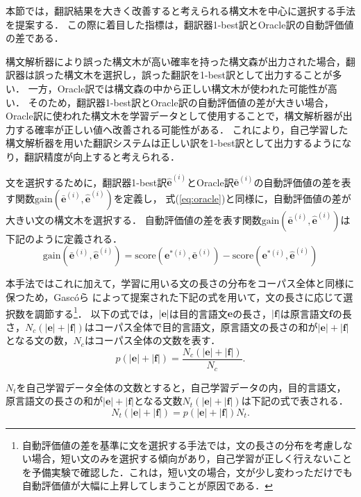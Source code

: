 \documentclass[japanese]{jnlp_1.4}
\begin{document}
本節では，翻訳結果を大きく改善すると考えられる構文木を中心に選択する手法を提案する．
この際に着目した指標は，翻訳器1-best訳とOracle訳の自動評価値の差である．

構文解析器により誤った構文木が高い確率を持った構文森が出力された場合，翻訳器は誤った構文木を選択し，誤った翻訳を1-best訳として出力することが多い．
一方，Oracle訳では構文森の中から正しい構文木が使われた可能性が高い．
そのため，翻訳器1-best訳とOracle訳の自動評価値の差が大きい場合，Oracle訳に使われた構文木を学習データとして使用することで，構文解析器が出力する確率が正しい値へ改善される可能性がある．
これにより，自己学習した構文解析器を用いた翻訳システムは正しい訳を1-best訳として出力するようになり，翻訳精度が向上すると考えられる．

文を選択するために，翻訳器1-best訳$\hat{\bm{e}}^{(i)}$とOracle訳$\bar{\bm{e}}^{(i)}$の自動評価値の差を表す関数$\text{gain}(\bar{\bm{e}}^{(i)},\hat{\bm{e}}^{(i)})$を定義し，
式(\ref{eq:oracle})と同様に，自動評価値の差が大きい文の構文木を選択する．
自動評価値の差を表す関数$\text{gain}(\bar{\bm{e}}^{(i)},\hat{\bm{e}}^{(i)})$は下記のように定義される．
\begin{equation}
\text{gain}(\bar{\bm{e}}^{(i)},\hat{\bm{e}}^{(i)})=\text{score}(\bm{e}^{*(i)}, \bar{\bm{e}}^{(i)})-\text{score}(\bm{e}^{*(i)}, \hat{\bm{e}}^{(i)})
\end{equation}

本手法ではこれに加えて，学習に用いる文の長さの分布をコーパス全体と同様に保つため，Gasc{\'o}ら \cite{gasco2012does} によって提案された下記の式を用いて，文の長さに応じて選択数を調節する\footnote{自動評価値の差を基準に文を選択する手法では，文の長さの分布を考慮しない場合，短い文のみを選択する傾向があり，自己学習が正しく行えないことを予備実験で確認した．これは，短い文の場合，文が少し変わっただけでも自動評価値が大幅に上昇してしまうことが原因である．}．
以下の式では，$|\bm{e}|$は目的言語文$\bm{e}$の長さ，$|\bm{f}|$は原言語文$\bm{f}$の長さ，$N_{c}(|\bm{e}|+|\bm{f}|)$はコーパス全体で目的言語文，原言語文の長さの和が$|\bm{e}|+|\bm{f}|$となる文の数，$N_{c}$はコーパス全体の文数を表す．
\begin{equation}
\label{eq:length_1}
p(|\bm{e}|+|\bm{f}|)=\frac{N_{c}(|\bm{e}|+|\bm{f}|)}{N_{c}}.
\end{equation}

$N_{t}$を自己学習データ全体の文数とすると，自己学習データの内，目的言語文，原言語文の長さの和が$|\bm{e}|+|\bm{f}|$となる文数$N_{t}(|\bm{e}|+|\bm{f}|)$は下記の式で表される．
\begin{equation}
\label{eq:length_2}
N_{t}(|\bm{e}|+|\bm{f}|)=p(|\bm{e}|+|\bm{f}|)N_{t}.
\end{equation}
\end{document}
